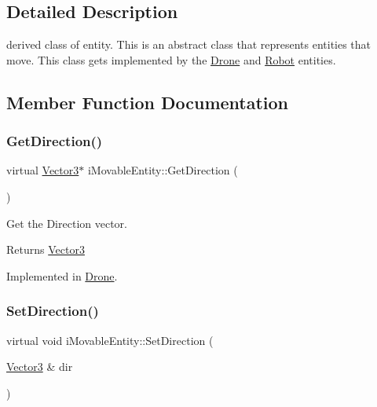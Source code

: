 \subsection{Detailed Description}
derived class of entity. This is an abstract class that represents entities that move. This class gets implemented by the \hyperlink{classDrone}{Drone} and \hyperlink{classRobot}{Robot} entities. 

\subsection{Member Function Documentation}
\mbox{\label{classiMovableEntity_a8705402280a16c7eb6a271d1be34e678}} 
\subsubsection{\texorpdfstring{Get\+Direction()}{GetDirection()}}
{\footnotesize\ttfamily virtual \hyperlink{classVector3}{Vector3}$\ast$ i\+Movable\+Entity\+::\+Get\+Direction (\begin{DoxyParamCaption}{ }\end{DoxyParamCaption})\hspace{0.3cm}{\ttfamily [pure virtual]}}



Get the Direction vector. 

\begin{DoxyReturn}{Returns}
\hyperlink{classVector3}{Vector3} 
\end{DoxyReturn}


Implemented in \hyperlink{classDrone_ad81e02cd82137d51ce68f4698812c949}{Drone}.

\mbox{\label{classiMovableEntity_a631c4a8e24360bedecf1a675a18b10ef}} 
\subsubsection{\texorpdfstring{Set\+Direction()}{SetDirection()}}
{\footnotesize\ttfamily virtual void i\+Movable\+Entity\+::\+Set\+Direction (\begin{DoxyParamCaption}\item[{\hyperlink{classVector3}{Vector3} \&}]{dir }\end{DoxyParamCaption})\hspace{0.3cm}{\ttfamily [pure virtual]}}



